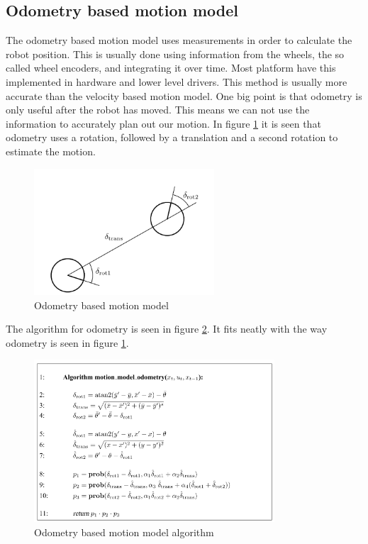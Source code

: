\subsection{Odometry based motion model}
The odometry based motion model uses measurements in order to calculate the robot position. This is usually done using information from the wheels, the so called wheel encoders, and integrating it over time. Most platform have this implemented in hardware and lower level drivers. This method is usually more accurate than the velocity based motion model. One big point is that odometry is only useful after the robot has moved.  This means we can not use the information to accurately plan out our motion. In figure \ref{fig:odometry} it is seen that odometry uses a rotation, followed by a translation and a second rotation to estimate the motion.
\begin{figure}[H]
\centering
\includegraphics[width=0.6\textwidth]{billeder/odometry}
\caption{Odometry based motion model}
\label{fig:odometry}
\end{figure}
The algorithm for odometry is seen in figure \ref{fig:odometryalgo}. It fits neatly with the way odometry is seen in figure \ref{fig:odometry}.
\begin{figure}[H]
\centering
\includegraphics[width=0.8\textwidth]{billeder/odometryalgo}
\caption{Odometry based motion model algorithm}
\label{fig:odometryalgo}
\end{figure}


